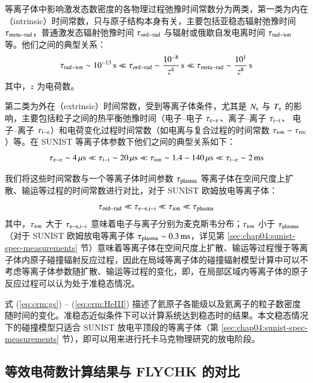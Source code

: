 等离子体中影响激发态数密度的各物理过程弛豫时间常数分为两类\cite{Summers2006}，第一类为内在（intrinsic）时间常数，只与原子结构本身有关，主要包括亚稳态辐射弛豫时间 $\tau_{\rm meta-rad}$，普通激发态辐射弛豫时间 $\tau_{\rm ord-rad}$ 与辐射或俄歇自发电离时间 $\tau_{\rm rad-ion}$ 等。他们之间的典型关系：
\begin{equation}
    \tau_{\rm rad-ion}\sim 10^{-13}\,{\rm s}\ll
    \tau_{\rm ord-rad}\sim \frac{10^{-8}}{z^4}\,{\rm s}\ll
    \tau_{\rm meta-rad}\sim \frac{10^1}{z^8}\,{\rm s}
\end{equation}
其中，$z$ 为电荷数。

第二类为外在（extrinsic）时间常数，受到等离子体条件，尤其是 $N_{\rm e}$ 与 $T_{\rm e}$ 的影响，主要包括粒子之间的热平衡弛豫时间（电子--电子 $\tau_{\rm e-e}$、离子--离子 $\tau_{\rm i-i}$、 电子--离子 $\tau_{\rm i-e}$）和电荷变化过程时间常数（如电离与复合过程的时间常数 $\tau_{\rm ion}\sim\tau_{\rm rec}$）等。在 SUNIST 等离子体参数下他们之间的典型关系如下：
\begin{equation}
    \tau_{\rm e-e}\sim 4\,\mu{\rm s}\ll
    \tau_{\rm i-i}\sim 20\,\mu{\rm s}\ll
    \tau_{\rm ion}\sim 1.4-140\,\mu{\rm s}\ll
    \tau_{\rm i-e}\sim 2\,{\rm ms}
\end{equation}

我们将这些时间常数与一个等离子体时间参数 $\tau_{\rm plasma}$ \pozhehao 等离子体在空间尺度上扩散、输运等过程的时间常数\pozhehao 进行对比，对于 SUNIST 欧姆放电等离子体：
\begin{equation}
\label{eq:chap03:time-constant-compare}
    \tau_{\rm ord-rad}\ll
    \tau_{\rm e-e,i-i}\ll
    \tau_{\rm ion}\ll
    \tau_{\rm plasma}
\end{equation}
其中，$\tau_{\rm ion}$ 大于 $\tau_{\rm e-e,i-i}$ 意味着电子与离子分别为麦克斯韦分布；$\tau_{\rm ion}$ 小于 $\tau_{\rm plasma}$（对于 SUNIST 欧姆放电等离子体 $\tau_{\rm plasma}\sim0.3\,{\rm ms}$，详见第 \ref{sec:chap04:sunist-spec-measurements} 节）意味着等离子体在空间尺度上扩散、输运等过程慢于等离子体内原子碰撞辐射反应过程，因此在局域等离子体的碰撞辐射模型计算中可以不考虑等离子体参数随扩散、输运等过程的变化，即，在局部区域内等离子体的原子反应过程可以认为处于准稳态情况。

式 (\ref{eq:crm:gs}) -- (\ref{eq:crm:HeIII}) 描述了氦原子各能级以及氦离子的粒子数密度随时间的变化。准稳态近似条件下可以计算系统达到稳态时的结果。本文稳态情况下的碰撞模型只适合 SUNIST 放电平顶段的等离子体（第 \ref{sec:chap04:sunist-spec-measurements} 节），即可以用来进行托卡马克物理研究的放电阶段。

\subsection{等效电荷数计算结果与 FLYCHK 的对比}
\label{sec:FLYCHK-compare}

